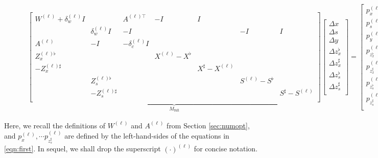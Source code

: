 \begin{figure}[h!]
  \begin{align}\label{eqn:very-long-eqn}
    \underbrace{
    \begin{bmatrix}
      W^{(\ell)}  + \delta^{(\ell)}_w I & & A^{(\ell)\top}& -I & I &  \\
      & \delta^{(\ell)}_w I & -I&&&-I & I\\
      A^{(\ell)}& -I & -\delta^{(\ell)}_c I\\
      Z_x^{(\ell)\flat}&&&X^{(\ell)}-X^\flat\\
      -Z_x^{(\ell)\sharp}&&&&X^\sharp-X^{(\ell)}\\
      &Z_s^{(\ell)\flat}&&&&S^{(\ell)}-S^\flat\\
      &-Z_s^{(\ell)\sharp}&&&&&S^\sharp-S^{(\ell)}\\
    \end{bmatrix}
    }_{M_\text{full}}
    \begin{bmatrix}
      \Delta x \\
      \Delta s \\
      \Delta y \\
      \Delta z_x^\flat \\
      \Delta z_x^\sharp \\
      \Delta z_s^\flat \\
      \Delta z_s^\sharp \\
    \end{bmatrix} =
    \begin{bmatrix}
      p^{(\ell)}_{x }\\
      p^{(\ell)}_{s }\\
      p^{(\ell)}_{y }\\
      p^{(\ell)}_{z_x^\flat }\\
      p^{(\ell)}_{z_x^\sharp }\\
      p^{(\ell)}_{z_s^\flat }\\
      p^{(\ell)}_{z_s^\sharp }\\
    \end{bmatrix}
  \end{align}
\end{figure}
Here, we recall the definitions of $W^{(\ell)}$ and $A^{(\ell)}$ from Section \ref{sec:numopt}, and
$p^{(\ell)}_x,\cdots p^{(\ell)}_{z_s^\sharp}$ are defined by the left-hand-sides of the equations in
\eqref{eqn:first}. In sequel, we shall drop the superscript
$(\cdot)^{(\ell)}$ for concise notation.

